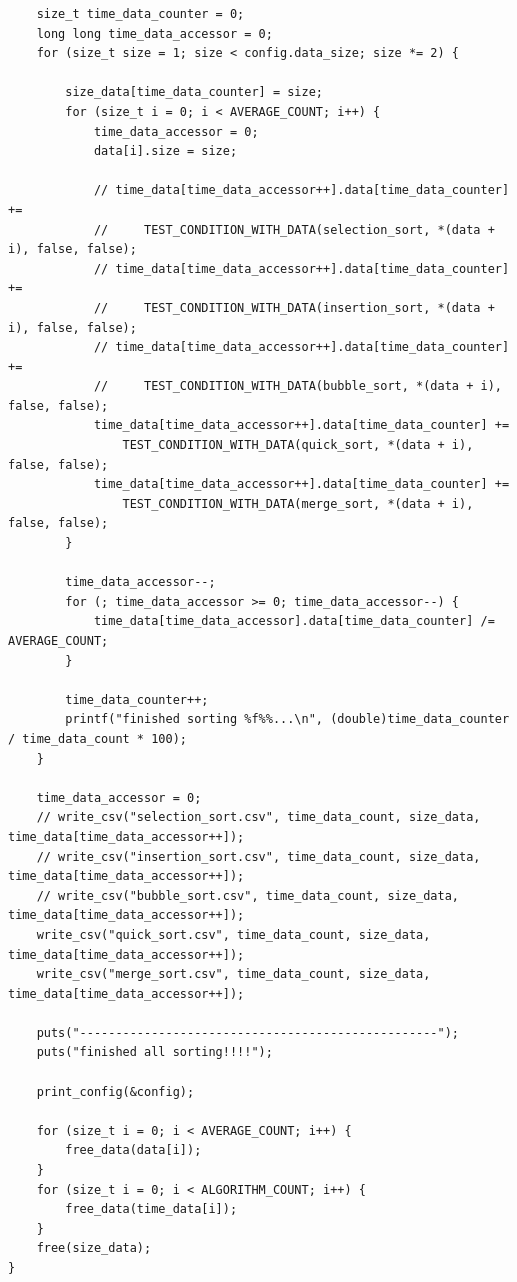 \documentclass[dvipdfmx, a4paper, titlepage]{jsarticle}
\begin{document}
{\begin{verbatim}
    size_t time_data_counter = 0;
    long long time_data_accessor = 0;
    for (size_t size = 1; size < config.data_size; size *= 2) {

        size_data[time_data_counter] = size;
        for (size_t i = 0; i < AVERAGE_COUNT; i++) {
            time_data_accessor = 0;
            data[i].size = size;

            // time_data[time_data_accessor++].data[time_data_counter] +=
            //     TEST_CONDITION_WITH_DATA(selection_sort, *(data + i), false, false);
            // time_data[time_data_accessor++].data[time_data_counter] +=
            //     TEST_CONDITION_WITH_DATA(insertion_sort, *(data + i), false, false);
            // time_data[time_data_accessor++].data[time_data_counter] +=
            //     TEST_CONDITION_WITH_DATA(bubble_sort, *(data + i), false, false);
            time_data[time_data_accessor++].data[time_data_counter] +=
                TEST_CONDITION_WITH_DATA(quick_sort, *(data + i), false, false);
            time_data[time_data_accessor++].data[time_data_counter] +=
                TEST_CONDITION_WITH_DATA(merge_sort, *(data + i), false, false);
        }

        time_data_accessor--;
        for (; time_data_accessor >= 0; time_data_accessor--) {
            time_data[time_data_accessor].data[time_data_counter] /= AVERAGE_COUNT;
        }

        time_data_counter++;
        printf("finished sorting %f%%...\n", (double)time_data_counter / time_data_count * 100);
    }

    time_data_accessor = 0;
    // write_csv("selection_sort.csv", time_data_count, size_data, time_data[time_data_accessor++]);
    // write_csv("insertion_sort.csv", time_data_count, size_data, time_data[time_data_accessor++]);
    // write_csv("bubble_sort.csv", time_data_count, size_data, time_data[time_data_accessor++]);
    write_csv("quick_sort.csv", time_data_count, size_data, time_data[time_data_accessor++]);
    write_csv("merge_sort.csv", time_data_count, size_data, time_data[time_data_accessor++]);

    puts("--------------------------------------------------");
    puts("finished all sorting!!!!");

    print_config(&config);

    for (size_t i = 0; i < AVERAGE_COUNT; i++) {
        free_data(data[i]);
    }
    for (size_t i = 0; i < ALGORITHM_COUNT; i++) {
        free_data(time_data[i]);
    }
    free(size_data);
}


\end{verbatim}}
\end{document}
